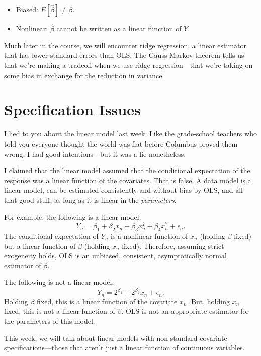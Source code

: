 \documentclass[12pt,oneside,openany]{book}
\begin{document}
\begin{itemize}
\item
  Biased: \(E[\hat{\beta}] \neq \beta\).
\item
  Nonlinear: \(\hat{\beta}\) cannot be written as a linear function of
  \(Y\).
\end{itemize}

Much later in the course, we will encounter ridge regression, a linear
estimator that has lower standard errors than OLS. The Gauss-Markov
theorem tells us that we're making a tradeoff when we use ridge
regression---that we're taking on some bias in exchange for the
reduction in variance.

\chapter{Specification Issues}\label{specification}

\providecommand{\pderiv}{}
\renewcommand{\pderiv}[2]{\frac{\partial{}#1}{\partial{}#2}}

I lied to you about the linear model last week. Like the grade-school
teachers who told you everyone thought the world was flat before
Columbus proved them wrong, I had good intentions---but it was a lie
nonetheless.

I claimed that the linear model assumed that the conditional expectation
of the response was a linear function of the covariates. That is false.
A data model is a linear model, can be estimated consistently and
without bias by OLS, and all that good stuff, as long as it is linear in
the \emph{parameters}.

For example, the following is a linear model. \[
Y_n = \beta_1 + \beta_2 x_n + \beta_3 x_n^2 + \beta_4 x_n^7 + \epsilon_n.
\] The conditional expectation of \(Y_n\) is a nonlinear function of
\(x_n\) (holding \(\beta\) fixed) but a linear function of \(\beta\)
(holding \(x_n\) fixed). Therefore, assuming strict exogeneity holds,
OLS is an unbiased, consistent, asymptotically normal estimator of
\(\beta\).

The following is not a linear model. \[
Y_n = 2^{\beta_1} + 2^{\beta_2} x_n + \epsilon_n.
\] Holding \(\beta\) fixed, this is a linear function of the covariate
\(x_n\). But, holding \(x_n\) fixed, this is not a linear function of
\(\beta\). OLS is not an appropriate estimator for the parameters of
this model.

This week, we will talk about linear models with non-standard covariate
specifications---those that aren't just a linear function of continuous
variables.
\end{document}
